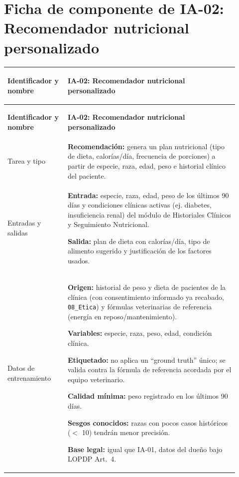 \section{Ficha de componente de IA-02: Recomendador nutricional personalizado}
\label{sec:ficha-ia02}

\begin{longtable}{@{}>{\bfseries\raggedright\arraybackslash}p{0.24\linewidth} >{\raggedright\arraybackslash}p{0.68\linewidth}@{}}
\toprule
\textbf{Identificador y nombre} & \textbf{IA-02: Recomendador nutricional personalizado} \\
\midrule
\endfirsthead
\toprule
\textbf{Identificador y nombre} & \textbf{IA-02: Recomendador nutricional personalizado} \\
\midrule
\endhead
\bottomrule
\endfoot
\bottomrule
\endlastfoot

Tarea y tipo & \textbf{Recomendación:} genera un plan nutricional (tipo de dieta, calorías/día, frecuencia de porciones) a partir de especie, raza, edad, peso e historial clínico del paciente. \\[4pt]

Entradas y salidas & \textbf{Entrada:} especie, raza, edad, peso de los últimos 90 días y condiciones clínicas activas (ej. diabetes, insuficiencia renal) del módulo de Historiales Clínicos y Seguimiento Nutricional.

\textbf{Salida:} plan de dieta con calorías/día, tipo de alimento sugerido y justificación de los factores usados. \\[4pt]

Datos de entrenamiento & \textbf{Origen:} historial de peso y dieta de pacientes de la clínica (con consentimiento informado ya recabado, \texttt{08\_Etica}) y fórmulas veterinarias de referencia (energía en reposo/mantenimiento).

\textbf{Variables:} especie, raza, peso, edad, condición clínica.

\textbf{Etiquetado:} no aplica un ``ground truth'' único; se valida contra la fórmula de referencia acordada por el equipo veterinario.

\textbf{Calidad mínima:} peso registrado en los últimos 90 días.

\textbf{Sesgos conocidos:} razas con pocos casos históricos ($<$ 10) tendrán menor precisión.

\textbf{Base legal:} igual que IA-01, datos del dueño bajo LOPDP Art.\ 4. \\[4pt]


\end{longtable}
